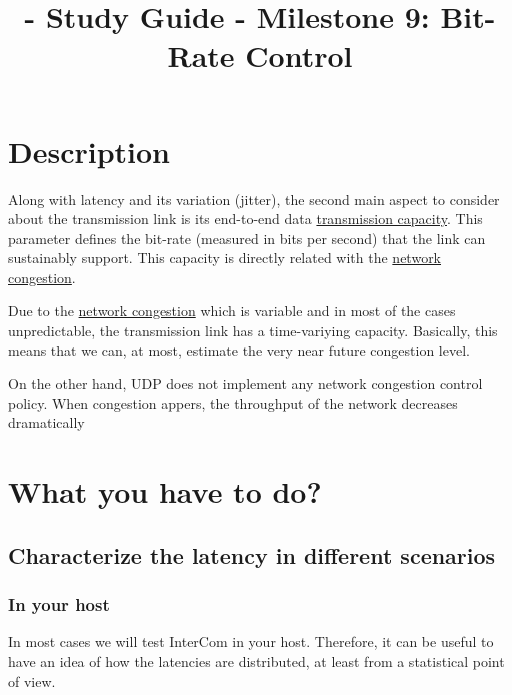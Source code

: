 
\title{\TM{} - Study Guide - Milestone 9: Bit-Rate Control}

\maketitle

\section{Description}

Along with latency and its variation (jitter), the second main aspect
to consider about the transmission link is its end-to-end data
\href{https://en.wikipedia.org/wiki/Bandwidth_(computing)}{transmission
  capacity}. This parameter defines the bit-rate (measured in bits per
second) that the link can sustainably support. This capacity is
directly related with the
\href{https://en.wikipedia.org/wiki/Network_congestion}{network
  congestion}.

Due to the
\href{https://en.wikipedia.org/wiki/Network_congestion}{network
  congestion} which is variable and in most of the cases
unpredictable, the transmission link has a time-variying
capacity. Basically, this means that we can, at most, estimate the
very near future congestion level.



On the other hand, UDP does not implement any network congestion
control policy. When congestion appers, the throughput of the network
decreases dramatically


\section{What you have to do?}

\subsection{Characterize the latency in different scenarios}

\subsubsection{In your host}

In most cases we will test InterCom in your host. Therefore, it can be
useful to have an idea of how the latencies are distributed, at least
from a statistical point of view.

